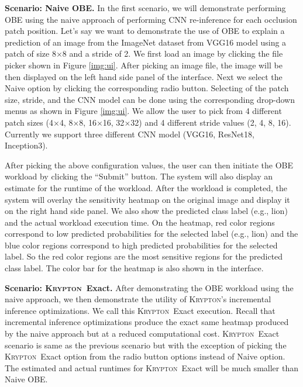 \documentclass{vldb}
\newcommand{\system}{\textsc{Krypton}}
\begin{document}
\vspace{2mm}
\noindent \textbf{Scenario: Naive OBE.} In the first scenario, we will demonstrate performing OBE using the naive approach of performing CNN re-inference for each occlusion patch position.
Let's say we want to demonstrate the use of OBE to explain a prediction of an image from the ImageNet dataset from VGG16 model using a patch of size 8$\times$8 and a stride of 2.
We first load an image by clicking the file picker shown in Figure \ref{img:ui}.
After picking an image file, the image will be then displayed on the left hand side panel of the interface.
Next we select the Naive option by clicking the corresponding radio button.
Selecting of the patch size, stride, and the CNN model can be done using the corresponding drop-down menus as shown in Figure \ref{img:ui}.
We allow the user to pick from 4 different patch sizes (4$\times$4, 8$\times$8, 16$\times$16, 32$\times$32) and 4 different stride values (2, 4, 8, 16).
Currently we support three different CNN model (VGG16, ResNet18, Inception3).

After picking the above configuration values, the user can then initiate the OBE workload by clicking the ``Submit'' button.
The system will also display an estimate for the runtime of the workload.
After the workload is completed, the system will overlay the sensitivity heatmap on the original image and display it on the right hand side panel.
We also show the predicted class label (e.g., lion) and the actual workload execution time.
On the heatmap, red color regions correspond to low predicted probabilities for the selected label (e.g., lion) and the blue color regions correspond to high predicted probabilities for the selected label. So the red color regions are the most sensitive regions for the predicted class label.
The color bar for the heatmap is also shown in the interface.

\vspace{2mm}
\noindent \textbf{Scenario: \system~Exact.} After demonstrating the OBE workload using the naive approach, we then demonstrate the utility of \system's incremental inference optimizations. We call this \system~Exact execution.
Recall that incremental inference optimizations produce the exact same heatmap produced by the naive approach but at a reduced computational cost.
\system~Exact scenario is same as the previous scenario but with the exception of picking the \system~Exact option from the radio button options instead of Naive option.
The estimated and actual runtimes for \system~Exact will be much smaller than Naive OBE.
\end{document}
